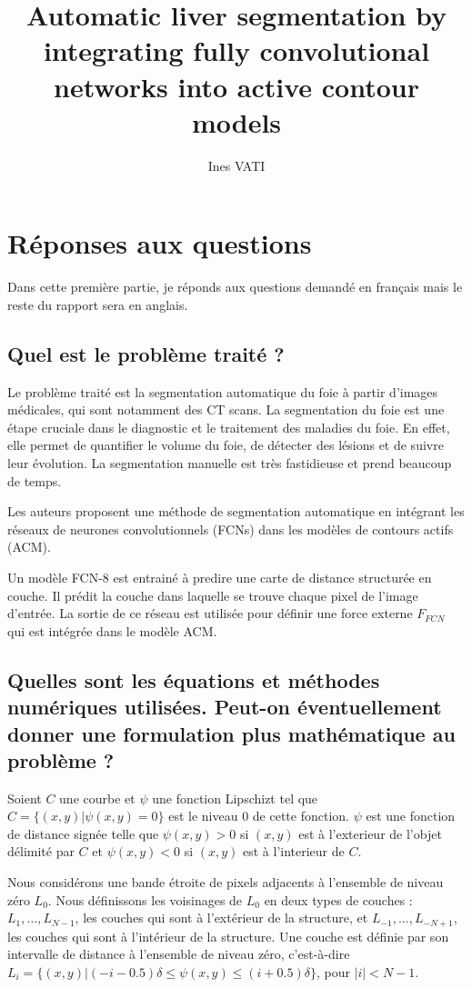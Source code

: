 \documentclass[a4paper, 11pt]{article}
\title{Automatic liver segmentation by integrating fully convolutional networks into active contour models}
\author[1, 2]{Ines VATI}
\affil[1]{École des Ponts ParisTech, Champs-sur-Marne, France}
\affil[2]{MVA, ENS Paris-Saclay, Cachan, France}
\affil[1, 2]{Email \email{ines.vati@eleves.enpc.fr}}
\date{}
\begin{document}
\maketitle

\section{Réponses aux questions}

Dans cette première partie, je réponds aux questions demandé en français mais le reste du rapport sera en anglais.

\subsection{Quel est le problème traité ?}
Le problème traité est la segmentation automatique du foie à partir d'images médicales, qui sont notamment des CT scans. La segmentation du foie est une étape cruciale dans le diagnostic et le traitement des maladies du foie. En effet, elle permet de quantifier le volume du foie, de détecter des lésions et de suivre leur évolution. La segmentation manuelle est très fastidieuse et prend beaucoup de temps. 

Les auteurs proposent une méthode de segmentation automatique en intégrant les réseaux de neurones convolutionnels (FCNs) dans les modèles de contours actifs (ACM). 

Un modèle FCN-$8$ est entrainé à predire une carte de distance structurée en couche. Il prédit la couche dans laquelle se trouve chaque pixel de l'image d'entrée. La sortie de ce réseau est utilisée pour définir une force externe $F_{FCN}$ qui est intégrée dans le modèle ACM.  

\subsection{Quelles sont les équations et méthodes numériques utilisées. Peut-on éventuellement donner une formulation plus mathématique au problème ?}

Soient $C$ une courbe et $\psi$ une fonction Lipschizt tel que 
$C = \{(x, y) | \psi(x, y) = 0\}$ est le niveau 0 de cette fonction. $\psi$ est une fonction de distance signée telle que $\psi(x, y) > 0$ 
si $(x, y)$ est à l'exterieur de l'objet délimité par $C$ et $\psi(x, y) < 0$ si $(x, y)$ est à l'interieur de $C$.

Nous considérons une bande étroite de pixels adjacents à l'ensemble de niveau zéro $L_0$. Nous définissons les voisinages de $L_0$ en deux types de couches : $L_1, \dots, L_{N-1}$, les couches qui sont à l'extérieur de la structure, et $L_{-1}, \dots, L_{-N+1}$, les couches qui sont à l'intérieur de la structure. Une couche est définie par son intervalle de distance à l'ensemble de niveau zéro, c'est-à-dire
$L_i = \lbrace (x, y) | (-i - 0.5)\delta \leq \psi(x, y) \leq (i + 0.5) \delta \rbrace$, pour $|i|<N-1$. 
\end{document}
